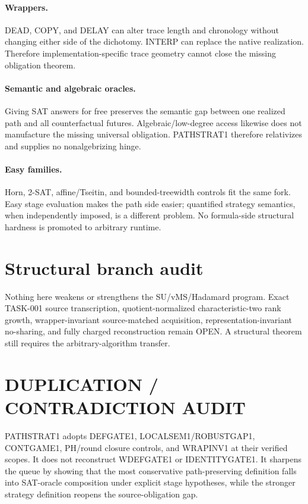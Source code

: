 \documentclass[11pt]{article}
\begin{document}
\paragraph{Wrappers.}
DEAD, COPY, and DELAY can alter trace length and chronology without changing either side of the dichotomy. INTERP can replace the native realization. Therefore implementation-specific trace geometry cannot close the missing obligation theorem.

\paragraph{Semantic and algebraic oracles.}
Giving SAT answers for free preserves the semantic gap between one realized path and all counterfactual futures. Algebraic/low-degree access likewise does not manufacture the missing universal obligation. PATHSTRAT1 therefore relativizes and supplies no nonalgebrizing hinge.

\paragraph{Easy families.}
Horn, 2-SAT, affine/Tseitin, and bounded-treewidth controls fit the same fork. Easy stage evaluation makes the path side easier; quantified strategy semantics, when independently imposed, is a different problem. No formula-side structural hardness is promoted to arbitrary runtime.

\section*{Structural branch audit}
Nothing here weakens or strengthens the SU/vMS/Hadamard program. Exact TASK-001 source transcription, quotient-normalized characteristic-two rank growth, wrapper-invariant source-matched acquisition, representation-invariant no-sharing, and fully charged reconstruction remain OPEN. A structural theorem still requires the arbitrary-algorithm transfer.

\section*{DUPLICATION / CONTRADICTION AUDIT}
PATHSTRAT1 adopts DEFGATE1, LOCALSEM1/ROBUSTGAP1, CONTGAME1, PH/round closure controls, and WRAPINV1 at their verified scopes. It does not reconstruct WDEFGATE1 or IDENTITYGATE1. It sharpens the queue by showing that the most conservative path-preserving definition falls into SAT-oracle composition under explicit stage hypotheses, while the stronger strategy definition reopens the source-obligation gap.
\end{document}
